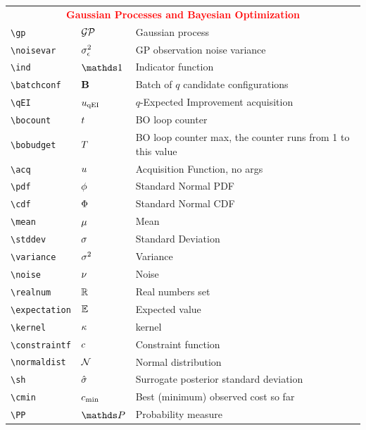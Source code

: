 \documentclass[]{article}
\begin{document}
\begin{table}[H]
\begin{tabular}{lll}
		\midrule
		\multicolumn{3}{c}{\textbf{\textcolor{red}{Gaussian Processes and Bayesian Optimization}}}\\
		\verb!\gp!  & $\mathcal{GP}$ & Gaussian process \\
		\verb!\noisevar!  & $\sigma_\epsilon^2$ & GP observation noise variance \\
		\verb!\ind!  & $\ind$ & Indicator function \\
		\verb!\batchconf!  & $\mathbf{B}$ & Batch of $q$ candidate configurations \\
		\verb!\qEI!  & $u_{\text{qEI}}$ & $q$-Expected Improvement acquisition \\
		\verb!\bocount!  & $t$ & BO loop counter \\
		\verb!\bobudget!  & $T$ & BO loop counter max, the counter runs from 1 to this value \\
		\verb!\acq!  & $u$ & Acquisition Function, no args \\
		\verb!\pdf!  & $\phi$ & Standard Normal PDF \\
		\verb!\cdf!  & $\Phi$ & Standard Normal CDF \\
		\verb!\mean!  & $\mu$ & Mean \\
		\verb!\stddev!  & $\sigma$ & Standard Deviation \\
		\verb!\variance!  & $\sigma^2$ & Variance \\
		\verb!\noise!  & $\nu$ & Noise \\
		\verb!\realnum!  & $\mathbb{R}$ & Real numbers set \\
		\verb!\expectation!  & $\mathbb{E}$ & Expected value \\
		\verb!\kernel!  & $\kappa$ & kernel \\
		\verb!\constraintf!  & $c$ & Constraint function \\
		\verb!\normaldist!  & $\mathcal{N}$ & Normal distribution \\
		\verb!\sh!  & $\hat{\sigma}$ & Surrogate posterior standard deviation\\
		\verb!\cmin!  & $c_{\min}$ & Best (minimum) observed cost so far\\
		\verb!\PP!  & $\PP$ & Probability measure\\
		\bottomrule
\end{tabular}
\end{table}
\end{document}
